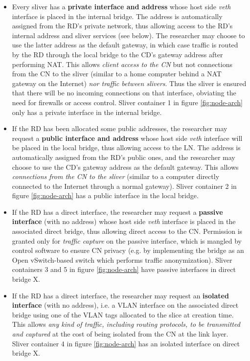 \documentclass[conference]{IEEEtran}
\begin{document}
\begin{itemize}
\item Every sliver has a \textbf{private interface and address} whose host
  side \emph{veth} interface is placed in the internal bridge.  The address is
  automatically assigned from the RD's private network, thus allowing access
  to the RD's internal address and sliver services (see below).  The
  researcher may choose to use the latter address as the default gateway, in
  which case traffic is routed by the RD through the local bridge to the CD's
  gateway address after performing NAT.  This allows \emph{client access to
    the CN} but not connections from the CN to the sliver (similar to a home
  computer behind a NAT gateway on the Internet) \emph{nor traffic between
    slivers}.  Thus the sliver is ensured that there will be no incoming
  connections on that interface, obviating the need for firewalls or access
  control.  Sliver container 1 in figure \ref{fig:node-arch} only has a
  private interface in the internal bridge.

\item If the RD has been allocated some public addresses, the researcher may
  request a \textbf{public interface and address} whose host side \emph{veth}
  interface will be placed in the local bridge, thus allowing access to the
  LN.  The address is automatically assigned from the RD's public ones, and
  the researcher may choose to use the CD's gateway address as the default
  gateway.  This allows \emph{connections from the CN to the sliver} (similar
  to a computer directly connected to the Internet through a normal gateway).
  Sliver container 2 in figure \ref{fig:node-arch} has a public interface in
  the local bridge.

\item If the RD has a direct interface, the researcher may request a
  \textbf{passive interface} (with no address) whose host side \emph{veth}
  interface is placed in the associated direct bridge, thus allowing direct
  access to the CN.  Permission is granted only for \emph{traffic capture} on
  the passive interface, which is mangled by control software to ensure CN
  privacy (e.g. by implementing the bridge as an Open vSwitch-based switch
  \cite{open-vswitch} which performs traffic anonymization).  Sliver
  containers 3 and 5 in figure \ref{fig:node-arch} have passive interfaces in
  direct bridge X.


\item If the RD has a direct interface, the researcher may request an
  \textbf{isolated interface} (with no address), i.e. a VLAN interface on the
  associated direct bridge using one of the VLAN tags allocated to the slice
  at creation time.  This allows \emph{any kind of traffic, including routing
    protocols, to be transmitted and captured} at the cost of being isolated
  from the CN at the link layer.  Sliver container 4 in figure
  \ref{fig:node-arch} has an isolated interface on direct bridge X.


\end{itemize}
\end{document}
